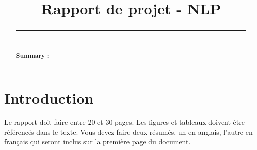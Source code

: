 \documentclass{rapportCS}
\title{Rapport de projet - NLP}
\begin{document}








        
\fairemarges %
\fairepagedegarde %

\begin{center}
	\begin{abstract}
        \lipsum[1]
        \rule{\linewidth}{0.2 mm} \\[0.4 cm]
        \begin{center}\textbf{Summary :}\end{center} 
        \lipsum[2]
    \end{abstract}
\end{center}
\newpage


\tabledematieres %




\section{Introduction} 
Le rapport doit faire entre 20 et 30 pages. Les figures et tableaux doivent être référencés dans le texte. 
Vous devez faire deux résumés, un en anglais, l'autre en français qui seront inclus sur la première page du document.
\end{document}

